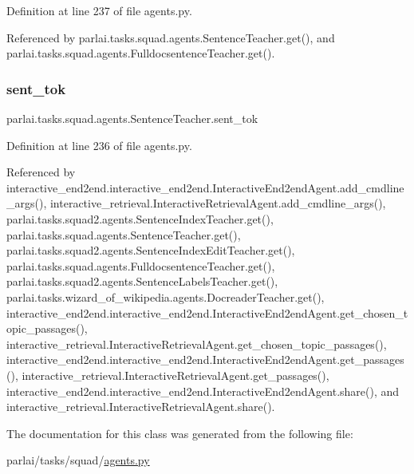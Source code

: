 Definition at line 237 of file agents.\+py.



Referenced by parlai.\+tasks.\+squad.\+agents.\+Sentence\+Teacher.\+get(), and parlai.\+tasks.\+squad.\+agents.\+Fulldocsentence\+Teacher.\+get().

\mbox{\label{classparlai_1_1tasks_1_1squad_1_1agents_1_1SentenceTeacher_a35acf467970e62528b74dd9a3dcc45a9}} 
\subsubsection{\texorpdfstring{sent\+\_\+tok}{sent\_tok}}
{\footnotesize\ttfamily parlai.\+tasks.\+squad.\+agents.\+Sentence\+Teacher.\+sent\+\_\+tok}



Definition at line 236 of file agents.\+py.



Referenced by interactive\+\_\+end2end.\+interactive\+\_\+end2end.\+Interactive\+End2end\+Agent.\+add\+\_\+cmdline\+\_\+args(), interactive\+\_\+retrieval.\+Interactive\+Retrieval\+Agent.\+add\+\_\+cmdline\+\_\+args(), parlai.\+tasks.\+squad2.\+agents.\+Sentence\+Index\+Teacher.\+get(), parlai.\+tasks.\+squad.\+agents.\+Sentence\+Teacher.\+get(), parlai.\+tasks.\+squad2.\+agents.\+Sentence\+Index\+Edit\+Teacher.\+get(), parlai.\+tasks.\+squad.\+agents.\+Fulldocsentence\+Teacher.\+get(), parlai.\+tasks.\+squad2.\+agents.\+Sentence\+Labels\+Teacher.\+get(), parlai.\+tasks.\+wizard\+\_\+of\+\_\+wikipedia.\+agents.\+Docreader\+Teacher.\+get(), interactive\+\_\+end2end.\+interactive\+\_\+end2end.\+Interactive\+End2end\+Agent.\+get\+\_\+chosen\+\_\+topic\+\_\+passages(), interactive\+\_\+retrieval.\+Interactive\+Retrieval\+Agent.\+get\+\_\+chosen\+\_\+topic\+\_\+passages(), interactive\+\_\+end2end.\+interactive\+\_\+end2end.\+Interactive\+End2end\+Agent.\+get\+\_\+passages(), interactive\+\_\+retrieval.\+Interactive\+Retrieval\+Agent.\+get\+\_\+passages(), interactive\+\_\+end2end.\+interactive\+\_\+end2end.\+Interactive\+End2end\+Agent.\+share(), and interactive\+\_\+retrieval.\+Interactive\+Retrieval\+Agent.\+share().



The documentation for this class was generated from the following file\+:\begin{DoxyCompactItemize}
\item 
parlai/tasks/squad/\hyperlink{parlai_2tasks_2squad_2agents_8py}{agents.\+py}\end{DoxyCompactItemize}
